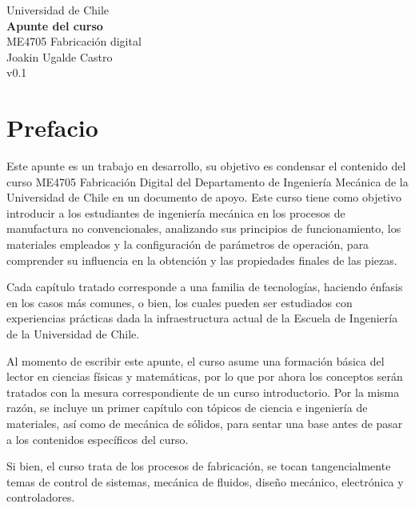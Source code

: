 \documentclass[12pt,letter,oneside]{book}
\numberwithin{equation}{chapter}
\numberwithin{figure}{chapter}
\numberwithin{table}{chapter}
\begin{document}
\begin{titlepage}
    \centering
     \vspace*{\fill}
    {\Large Universidad de Chile}\\[1cm]
    {\Huge \textbf{Apunte del curso}}\\[0.5cm]
    {\LARGE ME4705 Fabricación digital}\\[2cm]
    {\large Joakin Ugalde Castro}\\
    {\large v0.1}\\[4cm]
    \vfill
\end{titlepage}

\tableofcontents

\chapter*{Prefacio}

Este apunte es un trabajo en desarrollo, su objetivo es condensar el contenido del curso ME4705 Fabricación Digital del Departamento de Ingeniería Mecánica de la Universidad de Chile en un documento de apoyo. Este curso tiene como objetivo introducir a los estudiantes de ingeniería mecánica en los procesos de manufactura no convencionales, analizando sus principios de funcionamiento, los materiales empleados y la configuración de parámetros de operación, para comprender su influencia en la obtención y las propiedades finales de las piezas.

Cada capítulo tratado corresponde a una familia de tecnologías, haciendo énfasis en los casos más comunes, o bien, los cuales pueden ser estudiados con experiencias prácticas dada la infraestructura actual de la Escuela de Ingeniería de la Universidad de Chile.

Al momento de escribir este apunte, el curso asume una formación básica del lector en ciencias físicas y matemáticas, por lo que por ahora los conceptos serán tratados con la mesura correspondiente de un curso introductorio. Por la misma razón, se incluye un primer capítulo con tópicos de ciencia e ingeniería de materiales, así como de mecánica de sólidos, para sentar una base antes de pasar a los contenidos específicos del curso.

Si bien, el curso trata de los procesos de fabricación, se tocan tangencialmente temas de control de sistemas, mecánica de fluidos, diseño mecánico, electrónica y controladores.











\backmatter            %


\printbibliography
\end{document}
